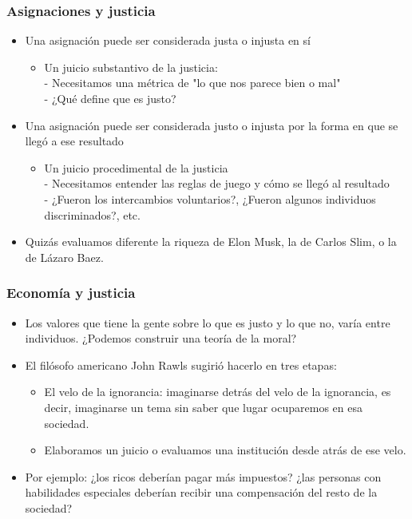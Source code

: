 \documentclass{beamer}
\begin{document}
\begin{frame}
\frametitle{Asignaciones y justicia}
\begin{itemize}
    \item Una asignación puede ser considerada justa o injusta en sí \vspace{2mm}
    \begin{itemize}
        \item Un juicio substantivo de la justicia:\\ \vspace{2mm}
        - Necesitamos una métrica de "lo que nos parece bien o mal" \\
        - ¿Qué define que es justo?
    \end{itemize}
    \vspace{4mm}
    \item  Una asignación puede ser considerada justo o  injusta por la forma en que se llegó a ese resultado\vspace{2mm}
    \begin{itemize}
        \item Un juicio procedimental de la justicia \\
        - Necesitamos entender las reglas de juego y cómo se llegó al resultado \\
        - ¿Fueron los intercambios voluntarios?, ¿Fueron algunos individuos discriminados?, etc.
    \end{itemize}
    \item Quizás evaluamos diferente la riqueza de Elon Musk, la de Carlos Slim, o la de Lázaro Baez. 
\end{itemize}
\end{frame}

\begin{frame}
\frametitle{Economía y justicia}
\begin{itemize}
    \item Los valores que tiene la gente sobre lo que es justo y lo que no, varía entre individuos. ¿Podemos construir una teoría de la moral?\vspace{4mm}
    \item El filósofo americano John Rawls sugirió hacerlo en tres etapas:\vspace{2mm}
    \begin{itemize}
        \item El velo de la ignorancia: imaginarse detrás del velo de la ignorancia, es decir, imaginarse un tema sin saber que lugar ocuparemos en esa sociedad.\vspace{2mm}
        \item Elaboramos un juicio o evaluamos una institución desde atrás de ese velo.\vspace{4mm}
    \end{itemize}
    \item Por ejemplo: ¿los ricos deberían pagar más impuestos? ¿las personas con habilidades especiales deberían recibir una compensación del resto de la sociedad? 
\end{itemize}
\end{frame}
\end{document}
